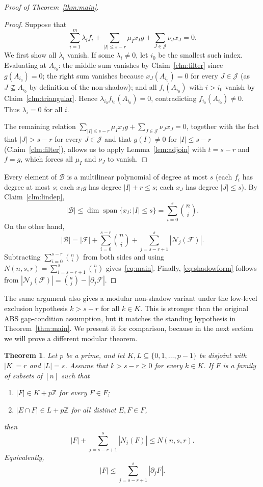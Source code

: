 \documentclass[11pt]{article}
\theoremstyle{plain}
\newtheorem{theorem}{Theorem}
\theoremstyle{remark}
\newcommand{\F}{\mathcal{F}}
\newcommand{\N}{\mathcal{N}}
\newcommand{\abs}[1]{\left|#1\right|}
\begin{document}
\begin{proof}[Proof of Theorem~\ref{thm:main}]
\begin{proof}
Suppose that
$$
  \sum_{i=1}^{m}\lambda_i f_i
  +\sum_{\abs{I}\le s-r}\mu_I x_I g
  +\sum_{J\in\mathcal{J}}\nu_J x_J=0.
$$
We first show all $\lambda_i$ vanish.
If some $\lambda_i\neq 0$, let $i_0$ be the smallest such index.
Evaluating at $A_{i_0}$: the middle sum vanishes by Claim~\ref{clm:filter} since $g(A_{i_0})=0$;
the right sum vanishes because $x_J(A_{i_0})=0$ for every $J\in\mathcal{J}$
(as $J\nsubseteq A_{i_0}$ by definition of the non-shadow);
and all $f_i(A_{i_0})$ with $i>i_0$ vanish by Claim~\ref{clm:triangular}.
Hence $\lambda_{i_0}f_{i_0}(A_{i_0})=0$, contradicting $f_{i_0}(A_{i_0})\neq 0$.
Thus $\lambda_i=0$ for all $i$.

The remaining relation $\sum_{\abs{I}\le s-r}\mu_I x_I g+\sum_{J\in\mathcal{J}}\nu_J x_J=0$,
together with the fact that $\abs{J}>s-r$ for every $J\in\mathcal{J}$ and that $g(I)\neq 0$
for $\abs{I}\le s-r$ (Claim~\ref{clm:filter}), allows us to apply Lemma~\ref{lem:adjoin}
with $t=s-r$ and $f=g$, which forces all $\mu_I$ and $\nu_J$ to vanish.
\end{proof}

\medskip
Every element of $\mathcal{B}$ is a multilinear polynomial of degree at most $s$
(each $f_i$ has degree at most $s$; each $x_Ig$ has degree $\abs{I}+r\le s$;
each $x_J$ has degree $\abs{J}\le s$).
By Claim~\ref{clm:lindep},
$$
  \abs{\mathcal{B}}\le \dim\operatorname{span}\{x_I:\abs{I}\le s\}=\sum_{i=0}^{s}\binom{n}{i}.
$$
On the other hand,
$$
  \abs{\mathcal{B}}=\abs{\F}+\sum_{i=0}^{s-r}\binom{n}{i}+\sum_{j=s-r+1}^{s}\abs{\N_j(\F)}.
$$
Subtracting $\sum_{i=0}^{s-r}\binom{n}{i}$ from both sides and using
$N(n,s,r)=\sum_{i=s-r+1}^{s}\binom{n}{i}$ gives~\eqref{eq:main}.
Finally, \eqref{eq:shadowform} follows from
$\abs{\N_j(\F)}=\binom{n}{j}-\abs{\partial_j\F}$.
\end{proof}

The same argument also gives a modular non-shadow variant under the low-level exclusion hypothesis
$k>s-r$ for all $k\in K$. This is stronger than the original ABS gap-condition assumption, but it
matches the standing hypothesis in Theorem~\ref{thm:main}. We present it for comparison, because in the next section we will prove a different modular theorem.

\begin{theorem}
Let $p$ be a prime, and let $K,L \subseteq \{0,1,\ldots,p-1\}$ be disjoint with $|K|=r$ and
$|L|=s$. Assume that $k>s-r\geq 0$ for every $k\in K$. If $F$ is a family of subsets of $[n]$ such that
\begin{enumerate}
\item[(i)] $|F| \in K+p\mathbb Z$ for every $F\in F$;
\item[(ii)] $|E\cap F| \in L+p\mathbb Z$ for all distinct $E,F\in F$,
\end{enumerate}
then
$$
|F|+\sum_{j=s-r+1}^{s}|N_j(F)| \le N(n,s,r).
$$
Equivalently,
$$
|F| \le \sum_{j=s-r+1}^{s} |\partial_j F|.
$$
\end{theorem}
\end{document}
